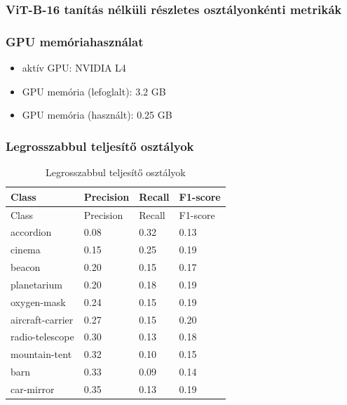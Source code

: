 \subsubsection{ViT-B-16 tanítás nélküli részletes osztályonkénti metrikák}
  

\subsubsection{GPU memóriahasználat}
\begin{itemize}
  \item aktív GPU: NVIDIA L4
  \item GPU memória (lefoglalt): 3.2 GB
  \item GPU memória (használt):  0.25 GB
\end{itemize}

\subsubsection{Legrosszabbul teljesítő osztályok}
\begin{center}
  \begin{longtable}{llll}
  \caption{Legrosszabbul teljesítő osztályok}\label{tab:phase01_ViT-B-16_legrosszabb_osztlyok}\\
  \toprule
  Class & Precision & Recall & F1-score \\
  \midrule
  \endfirsthead
  \toprule
  Class & Precision & Recall & F1-score \\
  \midrule
  \endhead
  accordion & 0.08 & 0.32 & 0.13 \\
  cinema & 0.15 & 0.25 & 0.19 \\
  beacon & 0.20 & 0.15 & 0.17 \\
  planetarium & 0.20 & 0.18 & 0.19 \\
  oxygen-mask & 0.24 & 0.15 & 0.19 \\
  aircraft-carrier & 0.27 & 0.15 & 0.20 \\
  radio-telescope & 0.30 & 0.13 & 0.18 \\
  mountain-tent & 0.32 & 0.10 & 0.15 \\
  barn & 0.33 & 0.09 & 0.14 \\
  car-mirror & 0.35 & 0.13 & 0.19 \\
  \bottomrule
  \end{longtable}
  \end{center}
  
  
